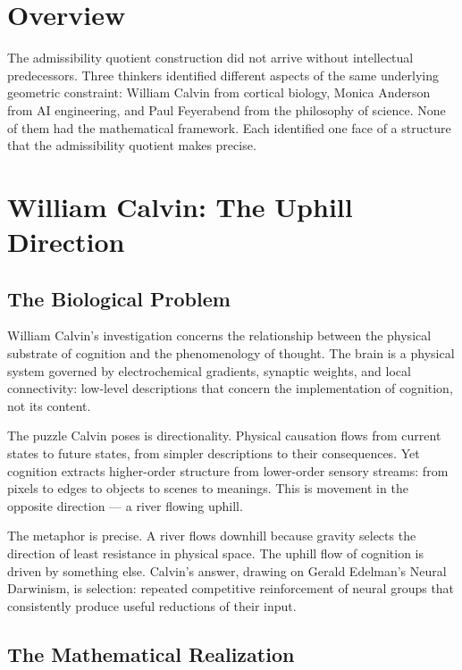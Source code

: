 \documentclass[12pt, a4paper, oneside]{book}
\begin{document}
\section{Overview}

The admissibility quotient construction did not arrive without
intellectual predecessors. Three thinkers identified different aspects
of the same underlying geometric constraint: William Calvin from cortical
biology, Monica Anderson from AI engineering, and Paul Feyerabend from
the philosophy of science. None of them had the mathematical framework.
Each identified one face of a structure that the admissibility quotient
makes precise.

\section{William Calvin: The Uphill Direction}

\subsection{The Biological Problem}

William Calvin's investigation concerns the relationship between the
physical substrate of cognition and the phenomenology of thought.
The brain is a physical system governed by electrochemical gradients,
synaptic weights, and local connectivity: low-level descriptions that
concern the implementation of cognition, not its content.

The puzzle Calvin poses is directionality. Physical causation flows
from current states to future states, from simpler descriptions to their
consequences. Yet cognition extracts higher-order structure from
lower-order sensory streams: from pixels to edges to objects to scenes
to meanings. This is movement in the opposite direction --- a river
flowing uphill.

The metaphor is precise. A river flows downhill because gravity selects
the direction of least resistance in physical space. The uphill flow of
cognition is driven by something else. Calvin's answer, drawing on
Gerald Edelman's Neural Darwinism, is selection: repeated competitive
reinforcement of neural groups that consistently produce useful
reductions of their input.

\subsection{The Mathematical Realization}
\end{document}

